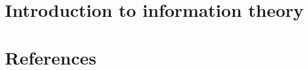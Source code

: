 \documentclass[14pt,a4paper]{report}
\begin{document}
\chapter{Introduction to information theory}
\noindent\makebox[\linewidth]{\rule{\textwidth}{0.4pt}}



%
%

\chapter{References}
\noindent\makebox[\linewidth]{\rule{\textwidth}{0.4pt}}

\label{finalpage}
\end{document}
